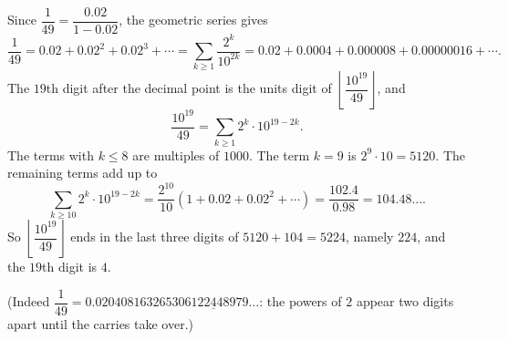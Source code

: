 Since $\dfrac{1}{49}=\dfrac{0.02}{1-0.02}$, the geometric series gives
\[\dfrac{1}{49}=0.02+0.02^2+0.02^3+\cdots=\sum_{k\ge1}\dfrac{2^k}{10^{2k}}=0.02+0.0004+0.000008+0.00000016+\cdots .\]
The $19$th digit after the decimal point is the units digit of $\left\lfloor\dfrac{10^{19}}{49}\right\rfloor$, and
\[\dfrac{10^{19}}{49}=\sum_{k\ge1}2^k\cdot10^{19-2k}.\]
The terms with $k\le8$ are multiples of $1000$. The term $k=9$ is $2^9\cdot10=5120$. The remaining terms add up to
\[\sum_{k\ge10}2^k\cdot10^{19-2k}=\dfrac{2^{10}}{10}\left(1+0.02+0.02^2+\cdots\right)=\dfrac{102.4}{0.98}=104.48\ldots .\]
So $\left\lfloor\dfrac{10^{19}}{49}\right\rfloor$ ends in the last three digits of $5120+104=5224$, namely $224$, and the $19$th digit is $\boxed{4}$.

(Indeed $\dfrac{1}{49}=0.020408163265306122\underline{4}48979\ldots$: the powers of $2$ appear two digits apart until the carries take over.)
